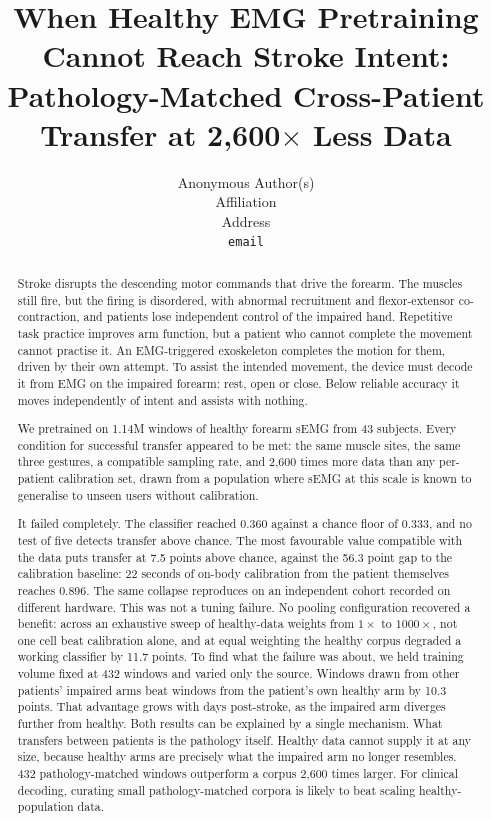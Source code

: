\documentclass{article}
\title{When Healthy EMG Pretraining Cannot Reach Stroke Intent: Pathology-Matched Cross-Patient Transfer at 2{,}600$\times$ Less Data}
\author{%
  Anonymous Author(s)\\
  Affiliation\\
  Address\\
  \texttt{email}\\
}
\begin{document}
\maketitle

\begin{abstract}
Stroke disrupts the descending motor commands that drive the forearm. The muscles still fire, but the firing is disordered, with abnormal recruitment and flexor-extensor co-contraction, and patients lose independent control of the impaired hand. Repetitive task practice improves arm function, but a patient who cannot complete the movement cannot practise it. An EMG-triggered exoskeleton completes the motion for them, driven by their own attempt. To assist the intended movement, the device must decode it from EMG on the impaired forearm: rest, open or close. Below reliable accuracy it moves independently of intent and assists with nothing.

We pretrained on 1.14M windows of healthy forearm sEMG from 43 subjects. Every condition for successful transfer appeared to be met: the same muscle sites, the same three gestures, a compatible sampling rate, and 2,600 times more data than any per-patient calibration set, drawn from a population where sEMG at this scale is known to generalise to unseen users without calibration.

It failed completely. The classifier reached 0.360 against a chance floor of 0.333, and no test of five detects transfer above chance. The most favourable value compatible with the data puts transfer at 7.5 points above chance, against the 56.3 point gap to the calibration baseline: 22 seconds of on-body calibration from the patient themselves reaches 0.896. The same collapse reproduces on an independent cohort recorded on different hardware. This was not a tuning failure. No pooling configuration recovered a benefit: across an exhaustive sweep of healthy-data weights from $1\times$ to $1000\times$, not one cell beat calibration alone, and at equal weighting the healthy corpus degraded a working classifier by 11.7 points. To find what the failure was about, we held training volume fixed at 432 windows and varied only the source. Windows drawn from other patients' impaired arms beat windows from the patient's own healthy arm by 10.3 points. That advantage grows with days post-stroke, as the impaired arm diverges further from healthy. Both results can be explained by a single mechanism. What transfers between patients is the pathology itself. Healthy data cannot supply it at any size, because healthy arms are precisely what the impaired arm no longer resembles. 432 pathology-matched windows outperform a corpus 2,600 times larger. For clinical decoding, curating small pathology-matched corpora is likely to beat scaling healthy-population data.
\end{abstract}
\end{document}
